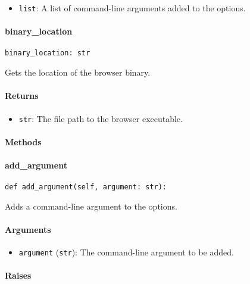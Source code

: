 \documentclass{article}
\begin{document}
\begin{itemize}
    \item \lstinline[style=pythonstyle]|list|: A list of command-line arguments added to the options.
\end{itemize}

\paragraph{binary\_location}

\begin{lstlisting}[style=pythonstyle]
binary_location: str
\end{lstlisting}

\noindent Gets the location of the browser binary.

\paragraph{Returns}

\begin{itemize}
    \item \lstinline[style=pythonstyle]|str|: The file path to the browser executable.
\end{itemize}

\paragraph{Methods}
\paragraph{add\_argument}

\begin{lstlisting}[style=pythonstyle]
def add_argument(self, argument: str):
\end{lstlisting}

\noindent Adds a command-line argument to the options.

\paragraph{Arguments}

\begin{itemize}
    \item \lstinline[style=pythonstyle]|argument| (\lstinline[style=pythonstyle]|str|): The command-line argument to be added.
\end{itemize}

\paragraph{Raises}
\end{document}

